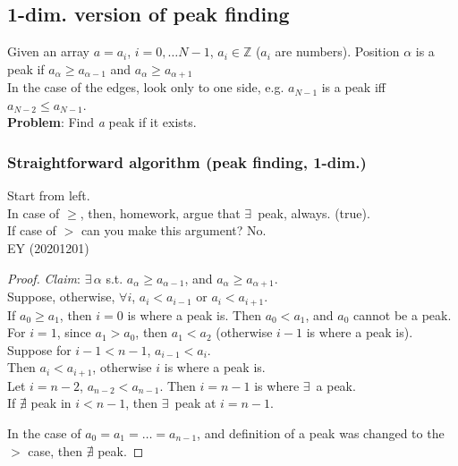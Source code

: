 \documentclass[10pt]{amsart}
\begin{document}
\begin{multicols*}{2}
\subsection{1-dim. version of peak finding}

Given an array $a= a_i$, $i=0, \dots N-1$, $a_i \in \mathbb{Z}$ ($a_i$ are numbers). Position $\alpha$ is a peak if $a_{\alpha} \geq a_{\alpha-1}$ and $a_{\alpha} \geq a_{\alpha + 1}$ \\

In the case of the edges, look only to one side, e.g. $a_{N-1}$ is a peak iff $a_{N-2} \leq a_{N-1}$. \\

\textbf{Problem}: Find \emph{a} peak if it exists. \\

\subsubsection{Straightforward algorithm (peak finding, 1-dim.)}

Start from left. \\

In case of $\geq$, then, homework, argue that $\exists \,$ peak, always. (true). \\
If case of $>$ can you make this argument? No. \\

EY (20201201)
\begin{proof}
	\emph{Claim}: $\exists \, \alpha$ s.t. $a_{\alpha} \geq a_{\alpha - 1}$, and $a_{\alpha} \geq a_{\alpha + 1}$. \\
	
	Suppose, otherwise, $\forall  i$, $a_i < a_{i-1}$ or $a_i < a_{i+1}$. \\
	If $a_0 \geq a_1$, then $i=0$ is where a peak is. Then $a_0 < a_1$, and $a_0$ cannot be a peak. \\
	For $i=1$, since $a_1 > a_0$, then $a_1 <a_2$ (otherwise $i-1$ is where a peak is). \\

	Suppose for $i - 1<n-1$, $a_{i-1} < a_i$. \\
	Then $a_i < a_{i+1}$, otherwise $i$ is where a peak is. \\
	Let $i= n-2$, $a_{n-2} < a_{n-1}$. Then $i = n-1$ is where $\exists \, $ a peak. \\
	If $\nexists$ peak in $i< n-1$, then $\exists \, $ peak at $i=n-1$. 
	
	In the case of $a_0 = a_1 = \dots = a_{n-1}$, and definition of a peak was changed to the $>$ case, then $\nexists $ peak.
\end{proof}


\end{multicols*}
\end{document}
